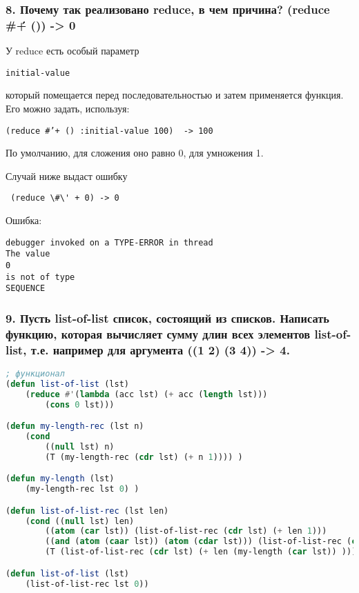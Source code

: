 \newpage
\subsubsection*{8. Почему так реализовано reduce, в чем причина? \newline (reduce \#\' + ()) -> 0}
У reduce есть особый параметр \begin{verbatim}initial-value \end{verbatim} который помещается перед последовательностью и затем применяется функция. Его можно задать, используя:
\begin{verbatim}
(reduce #’+ () :initial-value 100)  -> 100
\end{verbatim}

По умолчанию, для сложения оно равно 0, для умножения 1.


Случай ниже выдаст ошибку
\begin{verbatim}
 (reduce \#\' + 0) -> 0 
\end{verbatim}
Ошибка:
\begin{verbatim}
debugger invoked on a TYPE-ERROR in thread
The value
0
is not of type
SEQUENCE
\end{verbatim}

\newpage
\subsubsection*{9. Пусть list-of-list список, состоящий из списков. Написать функцию, которая вычисляет сумму длин всех элементов list-of-list, т.е. например для аргумента ((1 2) (3 4)) -> 4.}
\begin{lstlisting}[language=Lisp]
; функционал
(defun list-of-list (lst)
	(reduce #'(lambda (acc lst) (+ acc (length lst)))
		(cons 0 lst)))

(defun my-length-rec (lst n)
	(cond 
		((null lst) n)
		(T (my-length-rec (cdr lst) (+ n 1)))) )	

(defun my-length (lst)	
	(my-length-rec lst 0) )

(defun list-of-list-rec (lst len)
	(cond ((null lst) len)
		((atom (car lst)) (list-of-list-rec (cdr lst) (+ len 1)))
		((and (atom (caar lst)) (atom (cdar lst))) (list-of-list-rec (cdr lst) (+ len 2)))
		(T (list-of-list-rec (cdr lst) (+ len (my-length (car lst)) )))))

(defun list-of-list (lst)
	(list-of-list-rec lst 0))
\end{lstlisting}
